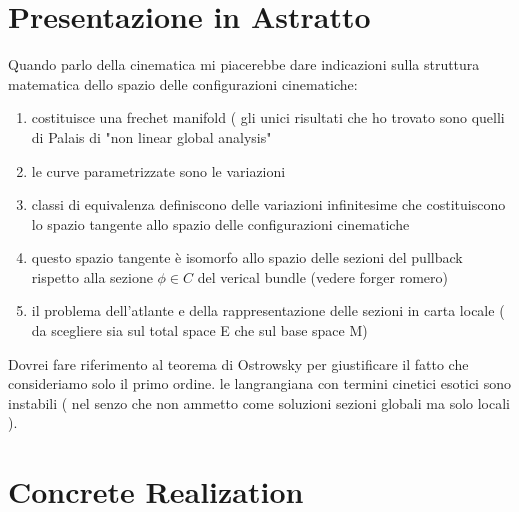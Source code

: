 \documentclass[Main]{subfiles}
\begin{document}
	\section{Presentazione in Astratto}
		Quando parlo della cinematica mi piacerebbe dare indicazioni sulla struttura matematica dello spazio delle configurazioni cinematiche:
			\begin{enumerate}
				\item costituisce una frechet manifold ( gli unici risultati che ho trovato sono quelli di Palais di "non linear global analysis"
				\item le curve parametrizzate sono le variazioni
				\item classi di equivalenza definiscono delle variazioni infinitesime che costituiscono lo spazio tangente allo spazio delle configurazioni cinematiche
				\item questo spazio tangente è isomorfo allo spazio delle sezioni del pullback rispetto alla sezione $\phi\in C$ del verical bundle (vedere forger romero)
				\item il problema dell'atlante e della rappresentazione delle sezioni in carta locale ( da scegliere sia sul total space E che sul base space M)
			\end{enumerate}
		Dovrei fare riferimento al teorema di Ostrowsky per giustificare il fatto che consideriamo solo il primo ordine. le langrangiana con termini cinetici esotici sono instabili ( nel senzo che non ammetto come soluzioni sezioni globali ma solo locali ).

	\section{Concrete Realization}
\end{document}
